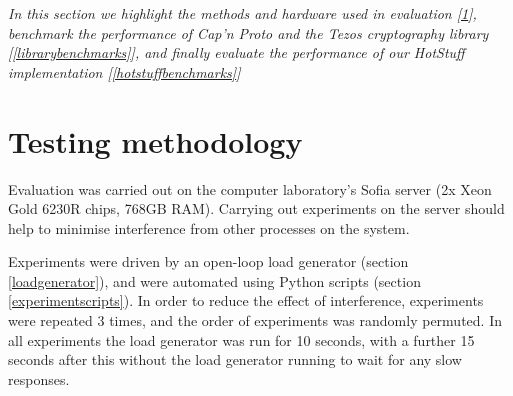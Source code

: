



\textit{In this section we highlight the methods and hardware used in evaluation [\ref{testingmethods}], benchmark the performance of Cap'n Proto and the Tezos cryptography library [\ref{librarybenchmarks}], and finally evaluate the performance of our HotStuff implementation [\ref{hotstuffbenchmarks}]}

\section{Testing methodology} \label{testingmethods}
Evaluation was carried out on the computer laboratory's Sofia server (2x Xeon Gold 6230R chips, 768GB RAM). Carrying out experiments on the server should help to minimise interference from other processes on the system.

Experiments were driven by an open-loop load generator (section \ref{loadgenerator}), and were automated using Python scripts (section \ref{experimentscripts}). In order to reduce the effect of interference, experiments were repeated 3 times, and the order of experiments was randomly permuted. In all experiments the load generator was run for 10 seconds, with a further 15 seconds after this without the load generator running to wait for any slow responses.

